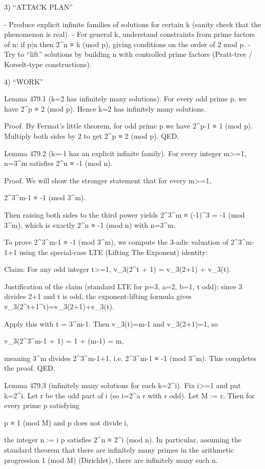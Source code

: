 3) “ATTACK PLAN”

- Produce explicit infinite families of solutions for certain k (sanity check that the phenomenon is real).
- For general k, understand constraints from prime factors of n: if p|n then 2^n ≡ k (mod p), giving conditions on the order of 2 mod p.
- Try to “lift” solutions by building n with controlled prime factors (Pratt-tree / Korselt-type constructions).

4) “WORK”

Lemma 479.1 (k=2 has infinitely many solutions).
For every odd prime p, we have 2^p ≡ 2 (mod p). Hence k=2 has infinitely many solutions.

Proof.
By Fermat's little theorem, for odd prime p we have 2^{p-1} ≡ 1 (mod p). Multiply both sides by 2 to get 2^p ≡ 2 (mod p).  QED.

Lemma 479.2 (k=-1 has an explicit infinite family).
For every integer m>=1, n=3^m satisfies 2^n ≡ -1 (mod n).

Proof.
We will show the stronger statement that for every m>=1,

    2^{3^{m-1}} ≡ -1 (mod 3^m).

Then raising both sides to the third power yields 2^{3^m} ≡ (-1)^3 = -1 (mod 3^m), which is exactly 2^n ≡ -1 (mod n) with n=3^m.

To prove 2^{3^{m-1}} ≡ -1 (mod 3^m), we compute the 3-adic valuation of 2^{3^{m-1}}+1 using the special-case LTE (Lifting The Exponent) identity:

Claim: For any odd integer t>=1,
    v_3(2^t + 1) = v_3(2+1) + v_3(t).

Justification of the claim (standard LTE for p=3, a=2, b=1, t odd): since 3 divides 2+1 and t is odd, the exponent-lifting formula gives v_3(2^t+1^t)=v_3(2+1)+v_3(t).

Apply this with t = 3^{m-1}. Then v_3(t)=m-1 and v_3(2+1)=1, so

    v_3(2^{3^{m-1}} + 1) = 1 + (m-1) = m,

meaning 3^m divides 2^{3^{m-1}}+1, i.e. 2^{3^{m-1}} ≡ -1 (mod 3^m). This completes the proof.  QED.

Lemma 479.3 (infinitely many solutions for each k=2^i).
Fix i>=1 and put k=2^i. Let r be the odd part of i (so i=2^a r with r odd). Let M := r. Then for every prime p satisfying

    p ≡ 1 (mod M)  and  p does not divide i,

the integer n := i p satisfies 2^n ≡ 2^i (mod n). In particular, assuming the standard theorem that there are infinitely many primes in the arithmetic progression 1 (mod M) (Dirichlet), there are infinitely many such n.


